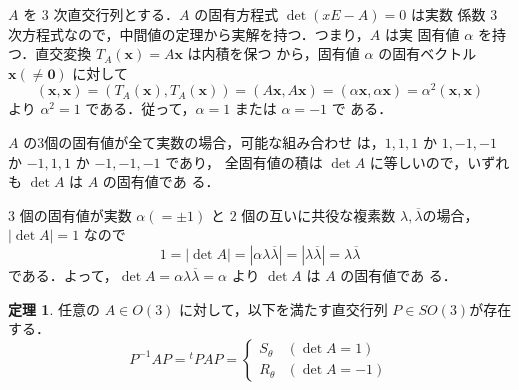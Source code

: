 \documentclass[11pt, uplatex, dvipdfmx, titlepage]{jsarticle}
\makeatletter
\renewcommand{\bar}[1]{\overline{#1}}
\renewenvironment{proof}[1][\proofname]{\par
  \pushQED{\qed}%
  \normalfont \topsep6\p@\@plus6\p@\relax
  \trivlist
  \item[\hskip\labelsep
         \bfseries
    {#1}]\ignorespaces
}{%
  \popQED\endtrivlist\@endpefalse
}
\theoremstyle{definition}
\newtheorem{theorem}{定理}[section]
\renewcommand{\proofname}{\textbf{証明}}
\makeatother
\begin{document}
\begin{proof}
  $A$ を $3$ 次直交行列とする．$A$ の固有方程式 $\det(x E -A)=0$ は実数
  係数 $3$ 次方程式なので，中間値の定理から実解を持つ．つまり，$A$ は実
  固有値 $\alpha$ を持つ．直交変換 $T_A(\bm{x}) = A\bm{x}$ は内積を保つ
  から，固有値 $\alpha$ の固有ベクトル $\bm{x} \left( \neq
    \bm{0}\right)$ に対して
  \[
    (\bm{x}, \bm{x}) = \left(T_A(\bm{x}), T_A(\bm{x}) \right)=
    (A\bm{x}, A\bm{x}) = (\alpha \bm{x}, \alpha \bm{x}) = \alpha^2
    (\bm{x}, \bm{x})
  \]
  より $\alpha^2 = 1$ である．従って，$\alpha=1$ または $\alpha=-1$ で
  ある．

  $A$ の3個の固有値が全て実数の場合，可能な組み合わせ
  は，$1,1,1$ か $1,-1,-1$ か $-1, 1,1$ か $-1,-1,-1$ であり，
  全固有値の積は $\det A$ に等しいので，いずれも $\det A$ は $A$ の固有値であ
  る．

  $3$ 個の固有値が実数 $\alpha \left( = \pm 1\right) $ と $2$
  個の互いに共役な複素数 $\lambda, \bar{\lambda}$の場合，$|\det A|=1$
  なので
  \[
    1 = |\det A| = |\alpha \lambda \bar{\lambda}| = |\lambda \bar{\lambda}| = \lambda \bar{\lambda}
  \]
  である．よって，$\det A = \alpha \lambda \bar{\lambda}=\alpha$ より $\det A$ は $A$ の固有値であ
  る．
\end{proof}


\begin{theorem}\label{thm:stdform3}
  任意の $A \in O(3)$ に対して，以下を満たす直交行列 $P \in
  SO(3)$が存在する．
  \[
    P^{-1} A P = {}^{t}P A P = 
    \begin{cases}
      S_{\theta} & (\det A=1)\\
      R_{\theta} & (\det A=-1)
    \end{cases}
  \]
\end{theorem}
\end{document}

